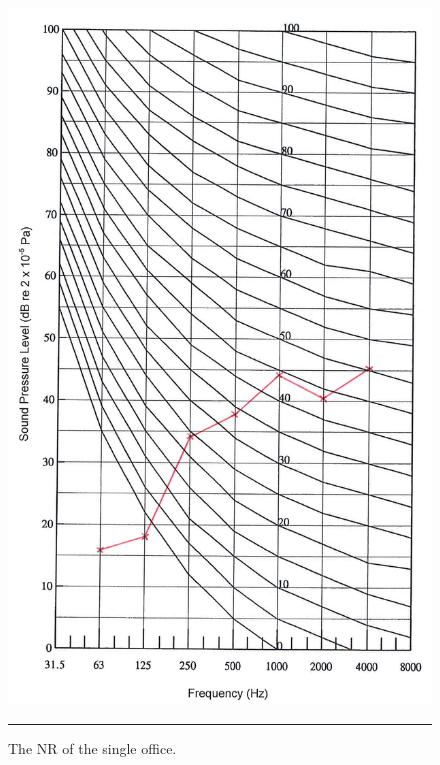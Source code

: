 \begin{figure}[htbp]
	\centering
	\includegraphics[height=.72\textheight]{figures/NR_office.jpg}
	\rule{.6\textwidth}{0.5pt} %
	\caption{The NR of the single office.}
	\label{fig:NR_office}
\end{figure}